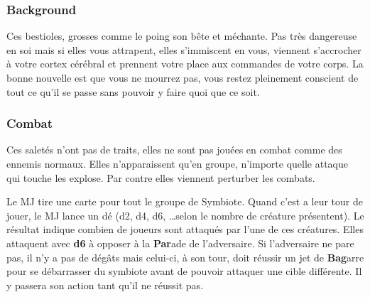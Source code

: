 \subsubsection{Background}
Ces bestioles, grosses comme le poing son bête et méchante. Pas très dangereuse en soi mais si elles vous attrapent, elles s’immiscent en vous, viennent s’accrocher à votre cortex cérébral et prennent votre place aux commandes de votre corps. La bonne nouvelle est que vous ne mourrez pas, vous restez pleinement conscient de tout ce qu’il se passe sans pouvoir y faire quoi que ce soit.

\subsubsection{Combat}
Ces saletés n’ont pas de traits, elles ne sont pas jouées en combat comme des ennemis normaux. Elles n’apparaissent qu’en groupe, n’importe quelle attaque qui touche les explose. Par contre elles viennent perturber les combats.

Le MJ tire une carte pour tout le groupe de Symbiote. Quand c’est a leur tour de jouer, le MJ lance un dé (d2, d4, d6, \dots selon le nombre de créature présentent). Le résultat indique combien de joueurs sont attaqués par l’une de ces créatures. Elles attaquent avec \textbf{d6} à opposer à la \textbf{Par}ade de l’adversaire. Si l’adversaire ne pare pas, il n’y a pas de dégâts mais celui-ci, à son tour, doit réussir un jet de \textbf{Bag}arre pour se débarrasser du symbiote avant de pouvoir attaquer une cible différente. Il y passera son action tant qu’il ne réussit pas.